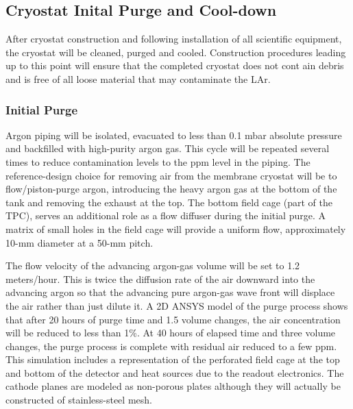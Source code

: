 \subsection{Cryostat Inital Purge and Cool-down}

After cryostat construction and following installation of all scientific equipment, the cryostat
will be cleaned, purged and cooled. Construction procedures leading up to this point will
ensure that the completed cryostat does not cont ain debris and is free of all loose material that may contaminate the LAr.

\subsubsection{Initial Purge}

Argon piping will be isolated, evacuated to less than 0.1 mbar absolute pressure and backfilled
with high-purity argon gas. This cycle will be repeated several times to reduce contamination
levels to the ppm level in the piping. The reference-design choice for removing air from the
membrane cryostat will be to flow/piston-purge argon, introducing the heavy argon gas at the
bottom of the tank and removing the exhaust at the top. The bottom field cage (part of the
TPC), serves an additional role as a flow diffuser during the initial
purge. A matrix of small holes in the field cage will provide a uniform flow, approximately
10-mm diameter at a 50-mm pitch. 

The flow velocity of the advancing argon-gas volume will be set to 1.2 meters/hour. This is twice the diffusion rate of the air downward into the advancing argon so that the advancing pure argon-gas wave front will displace the air rather than just dilute it. A
2D ANSYS model of the purge process shows that after 20 hours of purge time and 1.5 volume changes, the air concentration will be reduced to less than 1\%. At 40 hours of elapsed time and three volume
changes, the purge process is complete with residual air reduced to a few ppm. This
simulation includes a representation of the perforated field cage at the top and bottom of the
detector and heat sources due to the readout electronics. The cathode
planes are modeled as non-porous plates although they will actually be constructed of stainless-steel
mesh.

